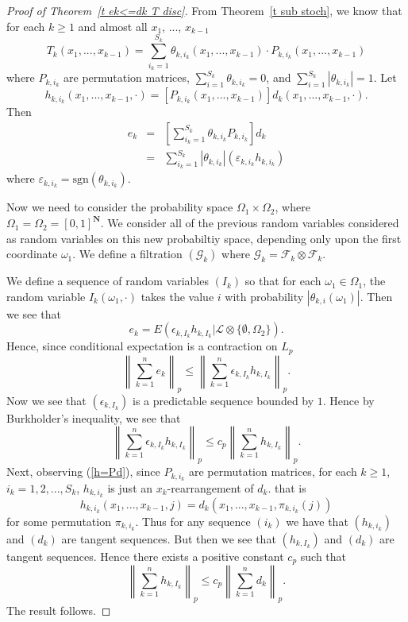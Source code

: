 \documentclass[12pt]{amsart}
\begin{document}
\begin{proof}[Proof of Theorem~\ref{t ek<=dk T disc}]
From Theorem~\ref{t sub stoch}, we know that for each $k\geq1$ and almost all
$x_1$, ..., $x_{k-1}$
\[T_k(x_1,...,x_{k-1})=\sum_{i_k=1}^{S_k} \theta _{k,i_k}(x_1,...,x_{k-1})\cdot P_{k,i_k}(x_1,...,x_{k-1})\]
where $P_{k,i_k}$ are permutation matrices, $\sum_{i=1}^{S_k}
\theta _{k,i_k}=0$, and $\sum_{i=1}^{S_k} |\theta _{k,i_k}|=1$. 
Let
\begin{equation}
\label{h=Pd}
h_{k,i_k}(x_1,...,x_{k-1},\cdot)=[P_{k,i_k}(x_1,...,x_{k-1})]d_k(x_1,...,x_{k-1},\cdot).
\end{equation}
Then
\begin{eqnarray*}
e_k& =& \left[\sum_{i_k=1}^{S_k} \theta _{k,i_k}P_{k,i_k}\right]d_k\\
&=&\sum_{i_k=1}^{S_k} |\theta _{k,i_k}|(\varepsilon _{k,i_k}h_{k,i_k})
\end{eqnarray*}
where $\varepsilon_{k,i_k}= \mbox{sgn}(\theta _{k,i_k})$.

Now we need to consider the probability space 
$\Omega_1 \times \Omega_2$, where 
$\Omega_1 = \Omega_2 = [0,1]^{\mathbf N}$.
We consider all of the previous random variables considered as
random variables on this new probabiltiy space, depending only upon
the first coordinate $\omega_1$.  We define a filtration 
$(\mathcal G_k)$ where $\mathcal G_k = \mathcal F_k \otimes \mathcal F_k$.

We define a sequence of random variables $(I_k)$ so that for
each $\omega_1 \in \Omega_1$, the random variable
$I_k(\omega_1,\cdot)$ takes the value $i$ with probability
$|\theta_{k,i}(\omega_1)|$.  Then we see that
\[ e_k = E(\epsilon_{k,I_k} h_{k,I_k} | 
   \mathcal L \otimes \{\emptyset,\Omega_2\}) .\]
Hence, since conditional expectation is a contraction on $L_p$
\[ 
\left\| \sum_{k=1}^n e_k \right\|_p
\le
\left\| \sum_{k=1}^n \epsilon_{k,I_k} h_{k,I_k} \right\|_p .
\]
Now we see that $(\epsilon_{k,I_k})$ is a predictable sequence
bounded by $1$.  Hence by Burkholder's inequality, we see
that
\[
\left\| \sum_{k=1}^n \epsilon_{k,I_k} h_{k,I_k} \right\|_p
\le
c_p
\left\| \sum_{k=1}^n h_{k,I_k} \right\|_p .
\]
Next, observing (\ref{h=Pd}), since $P_{k,i_k}$ are permutation
matrices, for each $k\geq1$, $i_k=1,2,...,S_k$, $h_{k,i_k}$ is
just an $x_k$-rearrangement of $d_k$. that is
\[h_{k,i_k}(x_1,...,x_{k-1},j)=d_k(x_1,...,x_{k-1},\pi_{k,i_k}(j))\]
for some permutation $\pi _{k,i_k}$. Thus for any sequence
$(i_k)$ we have that
$(h_{k,i_k})$ and
$(d_k)$ are tangent sequences.
But then we see that $(h_{k,I_k})$ and $(d_k)$ are tangent 
sequences.  Hence there
exists a positive constant $c_p$ such that
\[\left\|\sum_{k=1}^n h_{k,I_k}\right\|_p\leq
c_p \left\|\sum_{k=1}^n d_k\right\|_p . \] 
The result follows.
\end{proof}
\end{document}
